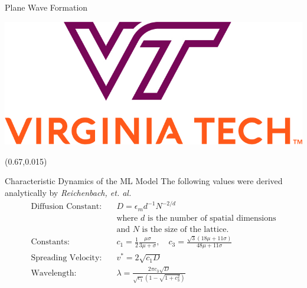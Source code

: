 \documentclass{beamer}
\begin{document}
\begin{frame}{}
\begin{textblock}{0.32}
\begin{block}{Plane Wave Formation}
\begin{figure}[h]
            \label{fig:plane_waves}
        \end{figure}
    \end{block}
    \hfill
    \begin{center}
        \includegraphics[width=0.25\linewidth]{images/vt_logo.jpg}
    \end{center}
    \hfill
\end{textblock}

\begin{textblock}{0.32}(0.67,0.015)
    \begin{block}{Characteristic Dynamics of the ML Model}
        The following values were derived analytically by \textit{Reichenbach, et. al.} \cite{reichenbach08} 
        \begin{align*}
            \text{Diffusion Constant:} \quad & D = \epsilon_m d^{-1} N^{-2 / d} \\
                                       \quad & \text{where } d \text{ is the number of spatial dimensions}\\
                                       \quad & \text{and } N \text{ is the size of the lattice.}\\
            \text{Constants:} \quad & c_1 = \frac{1}{2}\frac{\mu\sigma}{3\mu + \sigma}, \quad  c_3 = \frac{\sqrt{3}\left(18\mu + 11\sigma\right)}{48\mu + 11\sigma}\\
            \text{Spreading Velocity:} \quad & v^* = 2 \sqrt{c_1 D}\\
            \text{Wavelength:} \quad & \lambda = \frac{2\pi c_3 \sqrt{D}}{\sqrt{c_1}\left(1 - \sqrt{1 + c_3^2}\right)}\\
        \end{align*}


\end{block}
\end{textblock}
\end{frame}
\end{document}
